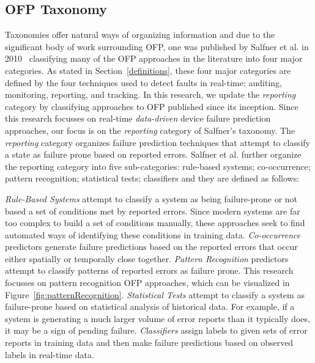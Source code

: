 \subsection{OFP Taxonomy}
Taxonomies offer natural ways of organizing information and due to the significant body of work surrounding OFP, one was published by Salfner et al. in 2010~\cite{salfnerSurvey} classifying many of the OFP approaches in the literature into four major categories.  As stated in Section~\ref{definitions}, these four major categories are defined by the four techniques used to detect faults in real-time: auditing, monitoring, reporting, and tracking.  In this research, we update the \emph{reporting} category by classifying approaches to OFP published since its inception.  Since this research focusses on real-time \emph{data-driven} device failure prediction approaches, our focus is on the \emph{reporting} category of Salfner's taxonomy.  The \emph{reporting} category organizes failure prediction techniques that attempt to classify a state as failure prone based on reported errors.  Salfner et al. further organize the reporting category into five sub-categories: rule-based systems; co-occurrence; pattern recognition; statistical tests; classifiers and they are defined as follows:

\emph{Rule-Based Systems} attempt to classify a system as being failure-prone or not based a set of conditions met by reported errors.  Since modern systems are far too complex to build a set of conditions manually, these approaches seek to find automated ways of identifying these conditions in training data.  \emph{Co-occurrence} predictors generate failure predictions based on the reported errors that occur either spatially or temporally close together.  \emph{Pattern Recognition} predictors attempt to classify patterns of reported errors as failure prone.  This research focusses on pattern recognition OFP approaches, which can be visualized in Figure~\ref{fig:patternRecognition}.  \emph{Statistical Tests} attempt to classify a system as failure-prone based on statistical analysis of historical data.  For example, if a system is generating a much larger volume of error reports than it typically does, it may be a sign of pending failure.  \emph{Classifiers} assign labels to given sets of error reports in training data and then make failure predictions based on observed labels in real-time data.

\figpatternRecognition

